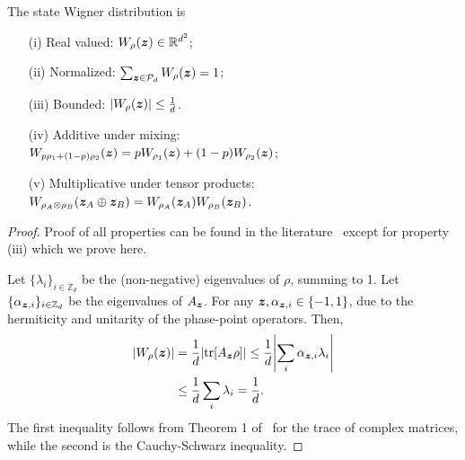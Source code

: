 \documentclass[pra,
aps,
twocolumn,
superscriptaddress,
groupedaddress,
nofootinbib,
reprint
]{revtex4-1}
\begin{document}
\begin{proposition}\label{thm:wstate}
  The state Wigner distribution is
  \begin{enumerate}
    \item[(i)]\label{en:w1} Real valued: $\W{\rho}(\bmz) \in \mathbb{R}^{d^2}$;
    \item[(ii)]\label{en:w2} Normalized: $\sum_{\bmz \in \cal{P}_d} \W[\bmz]{\rho}=1$;
    \item[(iii)]\label{en:w3} Bounded: $\abs{\W[\bmz]{\rho}} \leq \frac{1}{d}$.
    \item[(iv)]\label{en:w4} Additive under mixing: \vspace{2pt}\\
    $\W[\bmz]{p\rho_1 + (1-p)\rho_2} = p\W[\bmz]{\rho_1} + (1-p)\W[\bmz]{\rho_2}$;
    \item[(v)]\label{en:w5} Multiplicative under tensor products: \vspace{2pt}\\
    $\W[\bmz_A \oplus \bmz_B]{\rho_A \otimes \rho_B} = \W[\bmz_A]{\rho_A}\W[\bmz_B]{\rho_B}$.
	\end{enumerate}
\end{proposition}
\begin{proof}
	Proof of all properties can be found in the literature~\cite{cit:veitch,Vourdas_2004,cit:gross3,Wang_2019} except for property (iii) which we prove here.
	
Let $\{\lambda_i\}_{i \in \mathbb{Z}_d}$ be the (non-negative) eigenvalues of $\rho$, summing to 1.
Let $\{\alpha_{\bm{z},i}\}_{i \in \mathbb{Z}_d}$ be the eigenvalues of $A_{\bm{z}}$. For any $\bm{z}, \alpha_{\bm{z},i} \in \{-1, 1\}$, due to the hermiticity and unitarity of the phase-point operators. 
Then,
\begin{align}
	\abs{W_{\rho}(\bm{z})} &= \frac{1}{d}\abs{\mbox{tr}[A_{\bm{z}} \rho]} \leq \frac{1}{d} \abs{\sum_i \alpha_{\bm{z},i} \lambda_i} \nonumber\\ &\leq \frac{1}{d}\sum_i \lambda_i = \frac{1}{d}.
\end{align}
The first inequality follows from Theorem 1 of~\cite{cit:mirsky} for the trace of complex matrices, while the second is the Cauchy-Schwarz inequality.
\end{proof}
\end{document}
